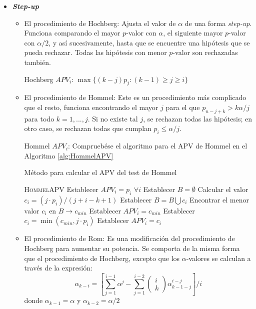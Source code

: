 \begin{itemize}
	\item \textbf{\textit{Step-up}}
	\begin{itemize}
		\item El procedimiento de Hochberg: 
		Ajusta el valor de $\alpha$ de una forma \textit{step-up}. 
		Funciona comparando el mayor $p$-valor con $\alpha$, el siguiente mayor $p$-valor con $\alpha/2$, y así sucesivamente, hasta que se encuentre una hipótesis que se pueda rechazar. 
		Todas las hipótesis con menor $p$-valor son rechazadas también. 
		
		Hochberg $APV_i$: $\max\{(k-j)p_j : (k-1) \geq j \geq i\}$
		
		\item El procedimiento de Hommel:
		Este es un procedimiento más complicado que el resto, funciona encontrando el mayor $j$ para el que $p_{n-j+k} > k\alpha/j$ para todo $k = 1,...,j$. 
		Si no existe tal $j$, se rechazan todas las hipótesis; en otro caso, se rechazan todas que cumplan $p_i \leq \alpha/j$.
		
		Hommel $APV_i$: Compruebése el algoritmo para el APV de Hommel en el Algoritmo \ref{alg:HommelAPV}
		
		\begin{algorithm}
		\caption{Método para calcular el APV del test de Hommel}\label{alg:HommelAPV}
\begin{algorithmic}[1]
\Procedure \textsc{HommelAPV}
\State Establecer $APV_i = p_i$ $\forall i$
	\State Establecer $B = \emptyset$
		\State Calcular el valor $c_i = (j \cdot p_i)/(j+i-k+1)$
		\State Establecer $B = B \bigcup c_i$
	\EndFor
	\State Encontrar el menor valor $c_i$ en $B \xrightarrow{}{} c_{min}$
		\State Establecer $APV_i = c_{min}$
	\EndIf
		\State Establecer $c_i = \min(c_{min}, j \cdot p_i)$
			\State Establecer $APV_i = c_i$
		\EndIf
	\EndFor
\EndFor
\EndProcedure
\end{algorithmic}
\end{algorithm}
		
		\item El procedimiento de Rom:  
		Es una modificación del procedimiento de Hochberg para aumentar su potencia. 
		Se comporta de la misma forma que el procedimiento de Hochberg, excepto que los $\alpha$-valores se calculan a través de la expresión:
		\begin{equation}
		\alpha_{k-i} = \left[ \sum_{j=1}^{i-1}\alpha^j - \sum_{j=1}^{i-2} \begin{pmatrix}
		i \\ k
\end{pmatrix}	\alpha_{k-1-j}^{i-j}	 \right] / i
		\label{eq:4.47}	
		\end{equation}
		donde $\alpha_{k-1} = \alpha$ y $\alpha_{k-2} = \alpha /2$
		

\end{itemize}
\end{itemize}
